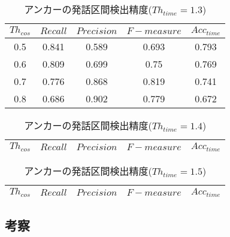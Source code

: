 \begin{table}[H]
  \begin{center}
    \caption{アンカーの発話区間検出精度($Th_{time}=1.3$) \label{table:result_get_anchor13}}
    \begin{tabular}{|c||c|c|c|c|} \hline
      $Th_{cos}$ & $Recall$ & $Precision$ & $F-measure$ & $Acc_{time}$\\ \hline
0.5 & 0.841 & 0.589 & 0.693 & 0.793 \\ \hline
0.6 & 0.809 & 0.699 & 0.75 & 0.769 \\ \hline
0.7 & 0.776 & 0.868 & 0.819 & 0.741 \\ \hline
0.8 & 0.686 & 0.902 & 0.779 & 0.672 \\ \hline

    \end{tabular}
  \end{center}
\end{table}

\begin{table}[H]
  \begin{center}
    \caption{アンカーの発話区間検出精度($Th_{time}=1.4$) \label{table:result_get_anchor14}}
    \begin{tabular}{|c||c|c|c|c|} \hline
      $Th_{cos}$ & $Recall$ & $Precision$ & $F-measure$ & $Acc_{time}$\\ \hline


    \end{tabular}
  \end{center}
\end{table}

\begin{table}[H]
  \begin{center}
    \caption{アンカーの発話区間検出精度($Th_{time}=1.5$) \label{table:result_get_anchor15}}
    \begin{tabular}{|c||c|c|c|c|} \hline
      $Th_{cos}$ & $Recall$ & $Precision$ & $F-measure$ & $Acc_{time}$\\ \hline


    \end{tabular}
  \end{center}
\end{table}
\subsection{考察}
